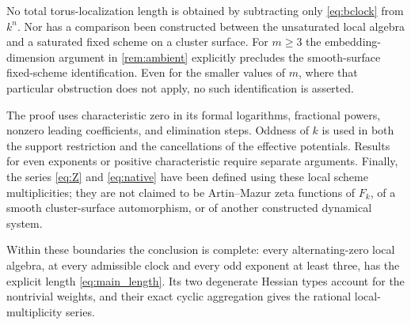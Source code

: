 No total torus-localization length is obtained by subtracting only
\eqref{eq:bclock} from $k^n$. Nor has a comparison been constructed between
the unsaturated local algebra and a saturated fixed scheme on a cluster
surface. For $m\geq3$ the embedding-dimension argument in
\cref{rem:ambient} explicitly precludes the smooth-surface fixed-scheme
identification. Even for the smaller values of $m$, where that particular
obstruction does not apply, no such identification is asserted.

The proof uses characteristic zero in its formal logarithms, fractional
powers, nonzero leading coefficients, and elimination steps. Oddness of
$k$ is used in both the support restriction and the cancellations of the
effective potentials. Results for even exponents or positive
characteristic require separate arguments. Finally, the series
\eqref{eq:Z} and \eqref{eq:native} have been defined using these local
scheme multiplicities; they are not claimed to be Artin--Mazur zeta
functions of $F_k$, of a smooth cluster-surface automorphism, or of another
constructed dynamical system.

Within these boundaries the conclusion is complete: every alternating-zero
local algebra, at every admissible clock and every odd exponent at least
three, has the explicit length \eqref{eq:main_length}. Its two degenerate
Hessian types account for the nontrivial weights, and their exact cyclic
aggregation gives the rational local-multiplicity series.
